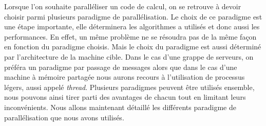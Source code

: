 Lorsque l'on souhaite paralléliser un code de calcul, on se retrouve à devoir choisir parmi plusieurs paradigme de parallélisation.
%
Le choix de ce paradigme est une étape importante, elle déterminera les algorithmes a utilisés et donc aussi les performances.
%
En effet, un même problème ne se résoudra pas de la même façon en fonction du paradigme choisis.
%
Mais le choix du paradigme est aussi déterminé par l'architecture de la machine cible.
%
Dans le cas d'une grappe de serveurs, on préféra un paradigme par passage de messages alors que dans le cas d'une machine à mémoire partagée nous aurons recours à l'utilisation de processus légers, aussi appelé {\em thread}.
%
Plusieurs paradigmes peuvent être utilisés ensemble, nous pouvons ainsi tirer parti des avantages de chacun tout en limitant leurs inconvénients.
%
Nous allons maintenant détaillé les différents paradigme de parallélisation que nous avons utilisés.
